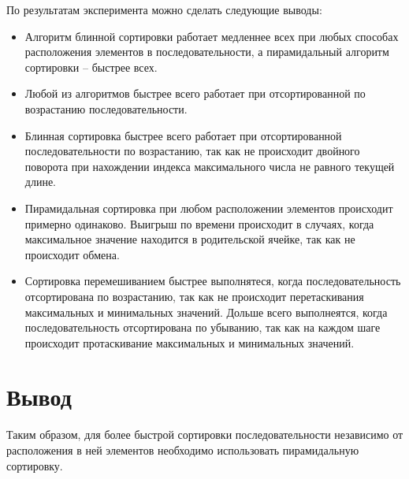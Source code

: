 По результатам эксперимента можно сделать следующие выводы:
\begin{itemize}[left=\parindent]
    \item Алгоритм блинной сортировки работает 
	медленнее всех при любых способах расположения элементов в последовательности, а пирамидальный алгоритм
	сортировки -- быстрее всех. 
	\item Любой из алгоритмов быстрее всего работает при отсортированной по 
	возрастанию последовательности.
	\item Блинная сортировка быстрее всего работает при отсортированной последовательности
	по возрастанию, так как не происходит двойного поворота при нахождении индекса максимального 
	числа не равного текущей длине. 
	\item Пирамидальная сортировка при любом расположении элементов происходит примерно одинаково.
	Выигрыш по времени происходит в случаях, когда максимальное значение находится в родительской ячейке, 
	так как не происходит обмена.
	\item Сортировка перемешиванием быстрее выполнятеся, когда последовательность 
	отсортирована по возрастанию, так как не происходит перетаскивания максимальных
	и минимальных значений. Дольше всего выполнеятся, когда последовательность 
	отсортирована по убыванию, так как на каждом шаге происходит протаскивание максимальных и
	минимальных значений.
\end{itemize}


\section{Вывод}

Таким образом, для более быстрой сортировки последовательности независимо от расположения
в ней элементов необходимо использовать пирамидальную сортировку. 

